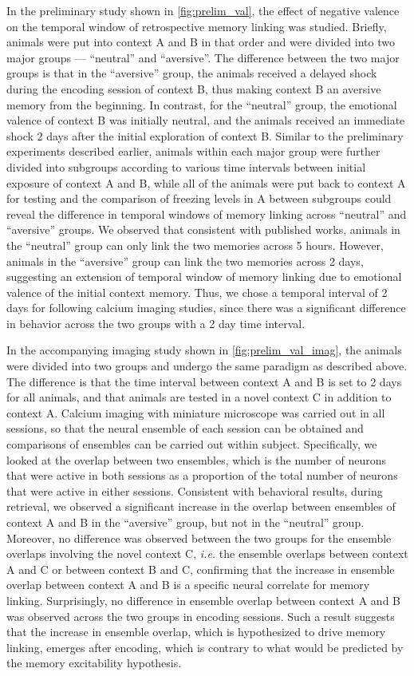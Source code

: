 \documentclass[master.tex]{subfiles}
\begin{document}
In the preliminary study shown in \autoref{fig:prelim_val}, the effect of
negative valence on the temporal window of retrospective memory linking was
studied. Briefly, animals were put into context A and B in that order and were
divided into two major groups --- ``neutral'' and ``aversive''. The difference
between the two major groups is that in the ``aversive'' group, the animals
received a delayed shock during the encoding session of context B, thus making
context B an aversive memory from the beginning. In contrast, for the
``neutral'' group, the emotional valence of context B was initially neutral, and
the animals received an immediate shock 2 days after the initial exploration of
context B. Similar to the preliminary experiments described earlier, animals
within each major group were further divided into subgroups according to
various time intervals between initial exposure of context A and B, while all of
the animals were put back to context A for testing and the comparison of
freezing levels in A between subgroups could reveal the difference in temporal
windows of memory linking across ``neutral'' and ``aversive'' groups. We
observed that consistent with published works, animals in the ``neutral'' group
can only link the two memories across 5 hours. However, animals in the
``aversive'' group can link the two memories across 2 days, suggesting an
extension of temporal window of memory linking due to emotional valence of the
initial context memory. Thus, we chose a temporal interval of 2 days for
following calcium imaging studies, since there was a significant difference in
behavior across the two groups with a 2 day time interval.

In the accompanying imaging study shown in \autoref{fig:prelim_val_imag}, the
animals were divided into two groups and undergo the same paradigm as described
above. The difference is that the time interval between context A and B is set
to 2 days for all animals, and that animals are tested in a novel context C in
addition to context A. Calcium imaging with miniature microscope was carried out
in all sessions, so that the neural ensemble of each session can be obtained and
comparisons of ensembles can be carried out within subject. Specifically, we
looked at the overlap between two ensembles, which is the number of neurons that
were active in both sessions as a proportion of the total number of neurons that
were active in either sessions. Consistent with behavioral results, during
retrieval, we observed a significant increase in the overlap between ensembles
of context A and B in the ``aversive'' group, but not in the ``neutral'' group.
Moreover, no difference was observed between the two groups for the ensemble
overlaps involving the novel context C, \textit{i.e.} the ensemble overlaps
between context A and C or between context B and C, confirming that the increase
in ensemble overlap between context A and B is a specific neural correlate for
memory linking. Surprisingly, no difference in ensemble overlap between context
A and B was observed across the two groups in encoding sessions. Such a result
suggests that the increase in ensemble overlap, which is hypothesized to drive
memory linking, emerges after encoding, which is contrary to what would be
predicted by the memory excitability hypothesis.
\end{document}

